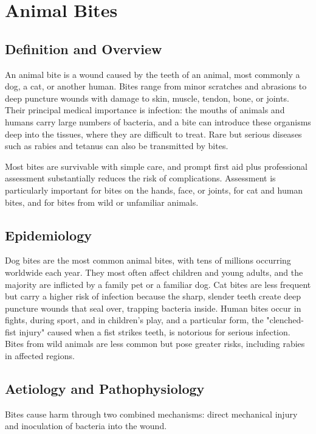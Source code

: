 \chapter{Animal Bites}

\section*{Definition and Overview}
An animal bite is a wound caused by the teeth of an animal, most commonly a dog, a cat, or another human. Bites range from minor scratches and abrasions to deep puncture wounds with damage to skin, muscle, tendon, bone, or joints. Their principal medical importance is infection: the mouths of animals and humans carry large numbers of bacteria, and a bite can introduce these organisms deep into the tissues, where they are difficult to treat. Rare but serious diseases such as rabies and tetanus can also be transmitted by bites.

Most bites are survivable with simple care, and prompt first aid plus professional assessment substantially reduces the risk of complications. Assessment is particularly important for bites on the hands, face, or joints, for cat and human bites, and for bites from wild or unfamiliar animals.

\section*{Epidemiology}
Dog bites are the most common animal bites, with tens of millions occurring worldwide each year. They most often affect children and young adults, and the majority are inflicted by a family pet or a familiar dog. Cat bites are less frequent but carry a higher risk of infection because the sharp, slender teeth create deep puncture wounds that seal over, trapping bacteria inside. Human bites occur in fights, during sport, and in children's play, and a particular form, the "clenched-fist injury" caused when a fist strikes teeth, is notorious for serious infection. Bites from wild animals are less common but pose greater risks, including rabies in affected regions.

\section*{Aetiology and Pathophysiology}
Bites cause harm through two combined mechanisms: direct mechanical injury and inoculation of bacteria into the wound.

